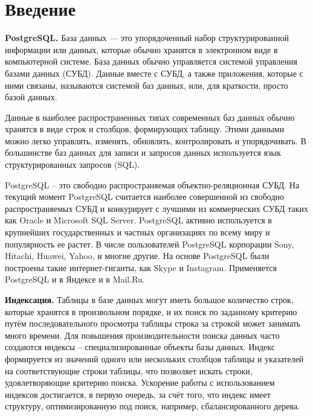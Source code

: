 \documentclass[12pt,oneside]{amsart}
\begin{document}
\tableofcontents
\pagebreak

%
%

\section*{Введение}

\textbf{PostgreSQL.} База данных — это упорядоченный набор структурированной информации или данных, которые обычно хранятся в электронном виде в компьютерной системе. База данных обычно управляется системой управления базами данных (СУБД). Данные вместе с СУБД, а также приложения, которые с ними связаны, называются системой баз данных, или, для краткости, просто базой данных.

Данные в наиболее распространенных типах современных баз данных обычно хранятся в виде строк и столбцов, формирующих таблицу. Этими данными можно легко управлять, изменять, обновлять, контролировать и упорядочивать. В большинстве баз данных для записи и запросов данных используется язык структурированных запросов (SQL).

PostgreSQL – это свободно распространяемая объектно-реляционная СУБД. На текущий момент PostgreSQL считается наиболее совершенной из свободно распространяемых СУБД и конкурирует с лучшими из коммерческих СУБД таких как Oracle и Microsoft SQL Server. PostgreSQL активно используется в крупнейших государственных и частных организациях по всему миру и популярность ее растет. В числе пользователей PostgreSQL корпорации Sony, Hitachi, Huawei, Yahoo, и многие другие. На основе PostgreSQL были построены такие интернет-гиганты, как Skype и Instagram. Применяется PostgreSQL и в Яндексе и в Mail.Ru.

\textbf{Индексация.} Таблицы в базе данных могут иметь большое количество строк, которые хранятся в произвольном порядке, и их поиск по заданному критерию путём последовательного просмотра таблицы строка за строкой может занимать много времени. Для повышения производительности поиска данных часто создаются индексы -- специализированные объекты базы данных. Индекс формируется из значений одного или нескольких столбцов таблицы и указателей на соответствующие строки таблицы, что позволяет искать строки, удовлетворяющие критерию поиска. Ускорение работы с использованием индексов достигается, в первую очередь, за счёт того, что индекс имеет структуру, оптимизированную под поиск, например, сбалансированного дерева.
\end{document}

